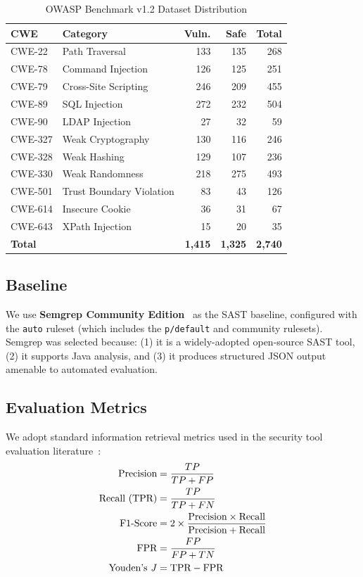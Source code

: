 \documentclass[conference]{IEEEtran}
\begin{document}
\begin{table}[t]
\centering
\caption{OWASP Benchmark v1.2 Dataset Distribution}
\label{tab:dataset}
\begin{tabular}{llrrr}
\toprule
\textbf{CWE} & \textbf{Category} & \textbf{Vuln.} & \textbf{Safe} & \textbf{Total} \\
\midrule
CWE-22  & Path Traversal           & 133  & 135  & 268 \\
CWE-78  & Command Injection        & 126  & 125  & 251 \\
CWE-79  & Cross-Site Scripting     & 246  & 209  & 455 \\
CWE-89  & SQL Injection            & 272  & 232  & 504 \\
CWE-90  & LDAP Injection           & 27   & 32   & 59  \\
CWE-327 & Weak Cryptography        & 130  & 116  & 246 \\
CWE-328 & Weak Hashing             & 129  & 107  & 236 \\
CWE-330 & Weak Randomness          & 218  & 275  & 493 \\
CWE-501 & Trust Boundary Violation & 83   & 43   & 126 \\
CWE-614 & Insecure Cookie          & 36   & 31   & 67  \\
CWE-643 & XPath Injection          & 15   & 20   & 35  \\
\midrule
\multicolumn{2}{l}{\textbf{Total}} & \textbf{1,415} & \textbf{1,325} & \textbf{2,740} \\
\bottomrule
\end{tabular}
\end{table}

\subsection{Baseline}
We use \textbf{Semgrep Community Edition}~\cite{semgrep2023} as the SAST baseline, configured with the \texttt{auto} ruleset (which includes the \texttt{p/default} and community rulesets). Semgrep was selected because: (1) it is a widely-adopted open-source SAST tool, (2) it supports Java analysis, and (3) it produces structured JSON output amenable to automated evaluation.

\subsection{Evaluation Metrics}
We adopt standard information retrieval metrics used in the security tool evaluation literature~\cite{delaitre2015nist}:
\begin{align}
    \text{Precision} &= \frac{TP}{TP + FP} \label{eq:precision} \\
    \text{Recall (TPR)} &= \frac{TP}{TP + FN} \label{eq:recall} \\
    \text{F1-Score} &= 2 \times \frac{\text{Precision} \times \text{Recall}}{\text{Precision} + \text{Recall}} \label{eq:f1} \\
    \text{FPR} &= \frac{FP}{FP + TN} \label{eq:fpr} \\
    \text{Youden's \textit{J}} &= \text{TPR} - \text{FPR} \label{eq:youden}
\end{align}
\end{document}
